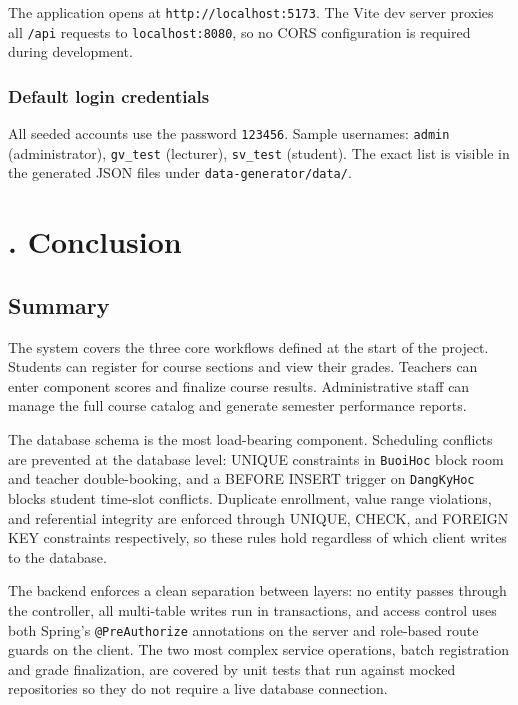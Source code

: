 \documentclass[12pt,a4paper]{report}
\begin{document}
The application opens at \texttt{http://localhost:5173}. The Vite dev server proxies all \texttt{/api} requests to \texttt{localhost:8080}, so no CORS configuration is required during development.

\subsection*{Default login credentials}

All seeded accounts use the password \texttt{123456}. Sample usernames: \texttt{admin} (administrator), \texttt{gv\_test} (lecturer), \texttt{sv\_test} (student). The exact list is visible in the generated JSON files under \texttt{data-generator/data/}.

\chapter{. Conclusion}

\section{Summary}

The system covers the three core workflows defined at the start of the project. Students can register for course sections and view their grades. Teachers can enter component scores and finalize course results. Administrative staff can manage the full course catalog and generate semester performance reports.

The database schema is the most load-bearing component. Scheduling conflicts are prevented at the database level: UNIQUE constraints in \texttt{BuoiHoc} block room and teacher double-booking, and a BEFORE INSERT trigger on \texttt{DangKyHoc} blocks student time-slot conflicts. Duplicate enrollment, value range violations, and referential integrity are enforced through UNIQUE, CHECK, and FOREIGN KEY constraints respectively, so these rules hold regardless of which client writes to the database.

The backend enforces a clean separation between layers: no entity passes through the controller, all multi-table writes run in transactions, and access control uses both Spring's \texttt{@PreAuthorize} annotations on the server and role-based route guards on the client. The two most complex service operations, batch registration and grade finalization, are covered by unit tests that run against mocked repositories so they do not require a live database connection.
\end{document}
